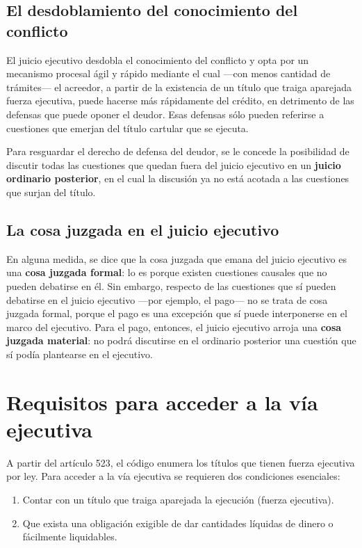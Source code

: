 \documentclass[12pt,oneside]{book}
\begin{document}
\subsection{El desdoblamiento del conocimiento del conflicto}

El juicio ejecutivo desdobla el conocimiento del conflicto y opta por un mecanismo procesal ágil y rápido mediante el cual ---con menos cantidad de trámites--- el acreedor, a partir de la existencia de un título que traiga aparejada fuerza ejecutiva, puede hacerse más rápidamente del crédito, en detrimento de las defensas que puede oponer el deudor. Esas defensas sólo pueden referirse a cuestiones que emerjan del título cartular que se ejecuta.

Para resguardar el derecho de defensa del deudor, se le concede la posibilidad de discutir todas las cuestiones que quedan fuera del juicio ejecutivo en un \textbf{juicio ordinario posterior}, en el cual la discusión ya no está acotada a las cuestiones que surjan del título.

\subsection{La cosa juzgada en el juicio ejecutivo}

En alguna medida, se dice que la cosa juzgada que emana del juicio ejecutivo es una \textbf{cosa juzgada formal}: lo es porque existen cuestiones causales que no pueden debatirse en él. Sin embargo, respecto de las cuestiones que sí pueden debatirse en el juicio ejecutivo ---por ejemplo, el pago--- no se trata de cosa juzgada formal, porque el pago es una excepción que sí puede interponerse en el marco del ejecutivo. Para el pago, entonces, el juicio ejecutivo arroja una \textbf{cosa juzgada material}: no podrá discutirse en el ordinario posterior una cuestión que sí podía plantearse en el ejecutivo.

\section{Requisitos para acceder a la vía ejecutiva}

A partir del artículo 523, el código enumera los títulos que tienen fuerza ejecutiva por ley. Para acceder a la vía ejecutiva se requieren dos condiciones esenciales:

\begin{enumerate}
    \item Contar con un título que traiga aparejada la ejecución (fuerza ejecutiva).
    \item Que exista una obligación exigible de dar cantidades líquidas de dinero o fácilmente liquidables.
\end{enumerate}
\end{document}
